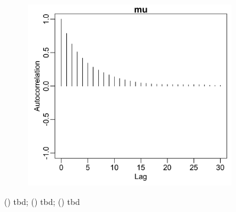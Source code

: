 \documentclass{uwstat572}
\begin{document}
\begin{figure}[H]
\begin{subfigure}[b]{0.49\textwidth}
		\includegraphics[width=\textwidth]{figures/mcmc_acf_plot_mu.png}
		\caption{}
		\label{fig:acf_mu}
	\end{subfigure}
	\caption{() tbd; () tbd; () tbd }
	\label{fig:diagnostics_mu}
\end{figure} 
\end{document}

